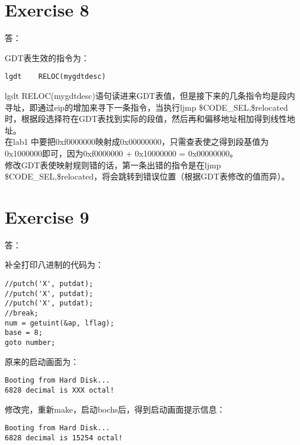 \documentclass{article}
\begin{document}
\section{Exercise 8}
\begin{Large}答：\end{Large}
GDT表生效的指令为：
\begin{verbatim}
lgdt	RELOC(mygdtdesc)
\end{verbatim}
lgdt RELOC(mygdtdesc)语句读进来GDT表值，但是接下来的几条指令均是段内寻址，即通过eip的增加来寻下一条指令，当执行ljmp \$CODE\_SEL,\$relocated时，根据段选择符在GDT表找到实际的段值，然后再和偏移地址相加得到线性地址。\\
在lab1 中要把0xf0000000映射成0x00000000，只需查表使之得到段基值为0x1000000即可，因为0xf0000000 + 0x10000000 = 0x00000000。\\
修改GDT表使映射规则错的话，第一条出错的指令是在ljmp	\$CODE\_SEL,\$relocated，将会跳转到错误位置（根据GDT表修改的值而异）。

\section{Exercise 9}
\begin{Large}答：\end{Large}
补全打印八进制的代码为：
\begin{verbatim}
//putch('X', putdat);
//putch('X', putdat);
//putch('X', putdat);
//break;
num = getuint(&ap, lflag);
base = 8;
goto number;
\end{verbatim}
原来的启动画面为：
\begin{verbatim}
Booting from Hard Disk...
6828 decimal is XXX octal!
\end{verbatim}
修改完，重新make，启动bochs后，得到启动画面提示信息：
\begin{verbatim}
Booting from Hard Disk...
6828 decimal is 15254 octal!
\end{verbatim} 
\end{document}
